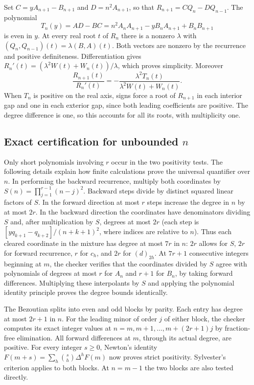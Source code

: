 Set $C=y A_{n+1}-B_{n+1}$ and $D=n^2 A_{n+1}$, so that
$R_{n+1}=CQ_n-DQ_{n-1}$. The polynomial
\[
 T_n(y)=AD-BC=n^2 A_n A_{n+1}-y B_n A_{n+1}+B_n B_{n+1}
\]
is even in $y$. At every real root $t$ of $R_n$ there is a nonzero
$\lambda$ with $(Q_n,Q_{n-1})(t)=\lambda(B,A)(t)$.
Both vectors are nonzero by the recurrence and positive definiteness.
Differentiation gives $R_n'(t)=(\lambda^2W(t)+W_n(t))/\lambda$,
which proves simplicity. Moreover
\[
 \frac{R_{n+1}(t)}{R_n'(t)}
 =-\frac{\lambda^2 T_n(t)}{\lambda^2 W(t)+W_n(t)} .
\]
When $T_n$ is positive on the real axis, signs force a root of
$R_{n+1}$ in each interior gap and one in each exterior gap, since
both leading coefficients are positive. The degree difference is one,
so this accounts for all its roots, with multiplicity one.

\subsection*{Exact certification for unbounded $n$}
Only short polynomials involving $r$ occur in the two positivity tests.
The following details explain how finite calculations prove the universal
quantifier over $n$. In performing the backward recurrence, multiply
both coordinates by $S(n)=\prod_{j=1}^{r-1}(n-j)^2$.
Backward steps divide by distinct squared linear factors of $S$.
In the forward direction at most $r$ steps increase the degree
in $n$ by at most $2r$. In the backward direction the coordinates
have denominators dividing $S$ and, after multiplication by $S$,
degrees at most $2r$ (each step is $[yq_{k+1}-q_{k+2}]/(n+k+1)^2$,
where indices are relative to $n$). Thus each cleared coordinate in the
mixture has degree at most $7r$ in $n$:
$2r$ allows for $S$, $2r$ for forward recurrence, $r$ for $c_h$,
and $2r$ for $(d)_{2h}$. At $7r+1$ consecutive integers beginning at
$m$, the checker verifies that the coordinates divided by $S$ agree with
polynomials of degrees at most $r$ for $A_n$ and $r+1$ for $B_n$, by taking
forward differences. Multiplying these interpolants by $S$ and applying the
polynomial identity principle proves the degree bounds identically.

The Bezoutian splits into even and odd blocks by parity. Each entry has
degree at most $2r+1$ in $n$. For the leading minor of order $j$ of
either block, the checker computes its exact integer values at
$n=m,m+1,\ldots,m+(2r+1)j$ by fraction-free elimination.
All forward differences at $m$, through its actual degree, are positive.
For every integer $s\ge0$, Newton's identity
$F(m+s)=\sum_h\binom{s}{h}\Delta^h F(m)$ now proves strict positivity.
Sylvester's criterion applies to both blocks. At $n=m-1$ the two
blocks are also tested directly.

